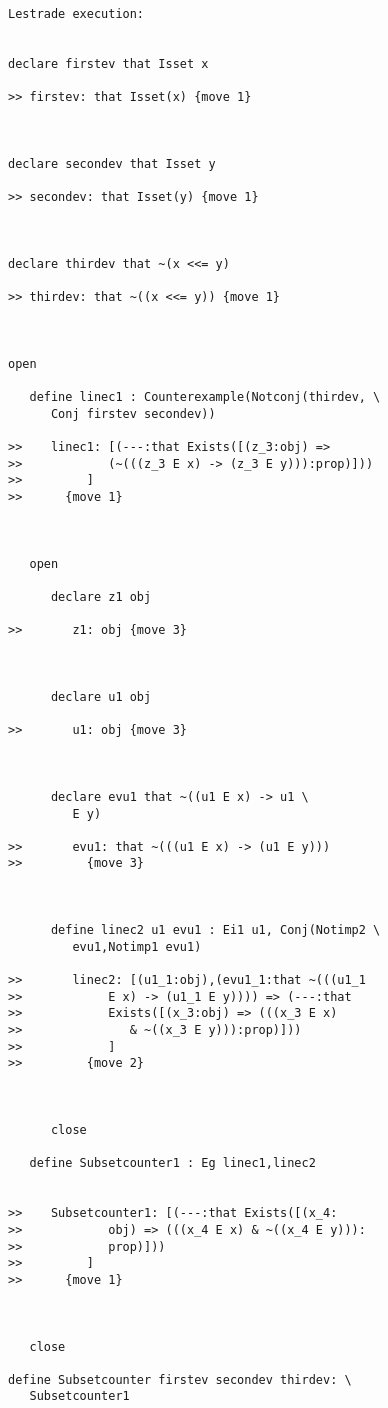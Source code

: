 \documentclass[12pt]{article}
\begin{document}
\begin{verbatim}Lestrade execution:


declare firstev that Isset x

>> firstev: that Isset(x) {move 1}



declare secondev that Isset y

>> secondev: that Isset(y) {move 1}



declare thirdev that ~(x <<= y)

>> thirdev: that ~((x <<= y)) {move 1}



open

   define linec1 : Counterexample(Notconj(thirdev, \
      Conj firstev secondev))

>>    linec1: [(---:that Exists([(z_3:obj) =>
>>            (~(((z_3 E x) -> (z_3 E y))):prop)]))
>>         ]
>>      {move 1}



   open

      declare z1 obj

>>       z1: obj {move 3}



      declare u1 obj

>>       u1: obj {move 3}



      declare evu1 that ~((u1 E x) -> u1 \
         E y)

>>       evu1: that ~(((u1 E x) -> (u1 E y)))
>>         {move 3}



      define linec2 u1 evu1 : Ei1 u1, Conj(Notimp2 \
         evu1,Notimp1 evu1)

>>       linec2: [(u1_1:obj),(evu1_1:that ~(((u1_1
>>            E x) -> (u1_1 E y)))) => (---:that
>>            Exists([(x_3:obj) => (((x_3 E x)
>>               & ~((x_3 E y))):prop)]))
>>            ]
>>         {move 2}



      close

   define Subsetcounter1 : Eg linec1,linec2


>>    Subsetcounter1: [(---:that Exists([(x_4:
>>            obj) => (((x_4 E x) & ~((x_4 E y))):
>>            prop)]))
>>         ]
>>      {move 1}



   close

define Subsetcounter firstev secondev thirdev: \
   Subsetcounter1


\end{verbatim}
\end{document}
